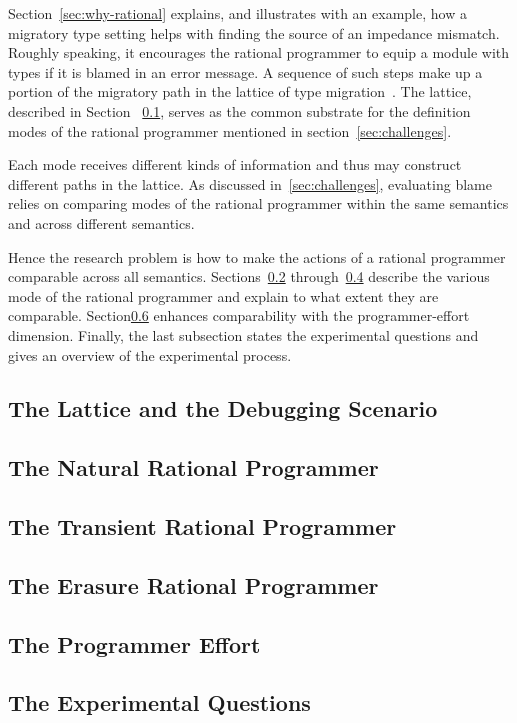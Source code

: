 
Section~\ref{sec:why-rational} explains, and illustrates with an example,
how a migratory type setting helps with finding the source of an impedance
mismatch. Roughly speaking, it encourages the rational programmer to
equip a module with types if it is blamed in an error message. A sequence
of such steps make up a portion of the migratory path in the lattice of
type migration~\cite{tfgnvf-popl-2016}. The lattice, described in Section
~\ref{sub:stuff},  serves as the common substrate for the definition modes
of the rational programmer mentioned in section~\ref{sec:challenges}. 

Each mode receives different kinds of information and thus may construct
different paths in the lattice. As discussed in~\ref{sec:challenges},
evaluating blame relies on comparing modes of the rational programmer
within the same semantics and across different semantics.  

Hence the research problem is how to make the actions of a rational programmer
comparable across all semantics. Sections~\ref{sub:natural}
through~\ref{sub:erasure} describe the various mode of the rational programmer and explain
to what extent they are comparable. Section\ref{sub:experiment}
enhances comparability with the programmer-effort dimension. Finally, the last
subsection states the experimental questions and gives an overview of the
experimental process. 

\def\rsub#1#2{\subsection{#2} \label{sub:#1} }

\rsub{stuff}     {The Lattice and the Debugging Scenario} 
\rsub{natural}   {The Natural Rational Programmer} 
\rsub{transient} {The Transient Rational Programmer} 
\rsub{erasure}   {The Erasure Rational Programmer} 
\rsub{effort}    {The Programmer Effort} \label{subsec:effort}
\rsub{experiment}{The Experimental Questions} 
